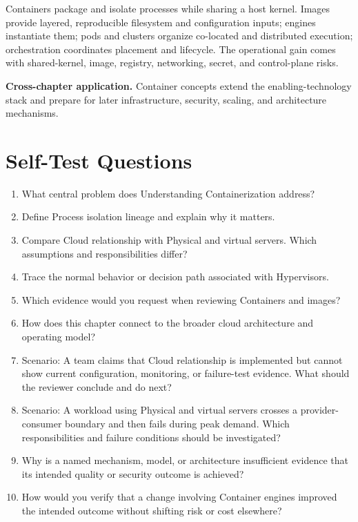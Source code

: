 \documentclass[11pt]{article}
\begin{document}
\begin{synthesisbox}
Containers package and isolate processes while sharing a host kernel. Images provide layered, reproducible filesystem and configuration inputs; engines instantiate them; pods and clusters organize co-located and distributed execution; orchestration coordinates placement and lifecycle. The operational gain comes with shared-kernel, image, registry, networking, secret, and control-plane risks.
\par\smallskip
\textbf{Cross-chapter application.} Container concepts extend the enabling-technology stack and prepare for later infrastructure, security, scaling, and architecture mechanisms.
\end{synthesisbox}
\section{Self-Test Questions}
\begin{enumerate}
\item What central problem does Understanding Containerization address?
\item Define Process isolation lineage and explain why it matters.
\item Compare Cloud relationship with Physical and virtual servers. Which assumptions and responsibilities differ?
\item Trace the normal behavior or decision path associated with Hypervisors.
\item Which evidence would you request when reviewing Containers and images?
\item How does this chapter connect to the broader cloud architecture and operating model?
\item Scenario: A team claims that Cloud relationship is implemented but cannot show current configuration, monitoring, or failure-test evidence. What should the reviewer conclude and do next?
\item Scenario: A workload using Physical and virtual servers crosses a provider-consumer boundary and then fails during peak demand. Which responsibilities and failure conditions should be investigated?
\item Why is a named mechanism, model, or architecture insufficient evidence that its intended quality or security outcome is achieved?
\item How would you verify that a change involving Container engines improved the intended outcome without shifting risk or cost elsewhere?
\end{enumerate}
\clearpage
\end{document}
